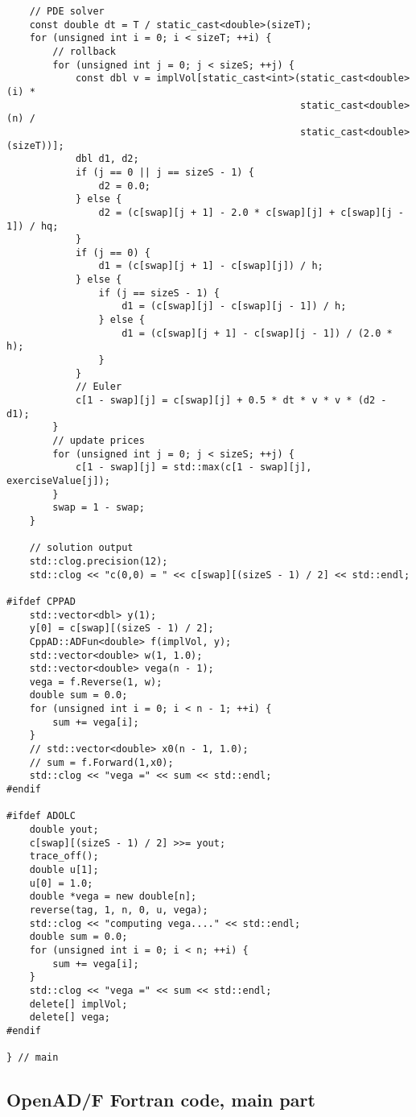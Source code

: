 \documentclass{amsart}
\theoremstyle{plain}
\numberwithin{equation}{section}
\begin{document}
\begin{verbatim}
    // PDE solver
    const double dt = T / static_cast<double>(sizeT);
    for (unsigned int i = 0; i < sizeT; ++i) {
        // rollback
        for (unsigned int j = 0; j < sizeS; ++j) {
            const dbl v = implVol[static_cast<int>(static_cast<double>(i) *
                                                   static_cast<double>(n) /
                                                   static_cast<double>(sizeT))];
            dbl d1, d2;
            if (j == 0 || j == sizeS - 1) {
                d2 = 0.0;
            } else {
                d2 = (c[swap][j + 1] - 2.0 * c[swap][j] + c[swap][j - 1]) / hq;
            }
            if (j == 0) {
                d1 = (c[swap][j + 1] - c[swap][j]) / h;
            } else {
                if (j == sizeS - 1) {
                    d1 = (c[swap][j] - c[swap][j - 1]) / h;
                } else {
                    d1 = (c[swap][j + 1] - c[swap][j - 1]) / (2.0 * h);
                }
            }
            // Euler
            c[1 - swap][j] = c[swap][j] + 0.5 * dt * v * v * (d2 - d1);
        }
        // update prices
        for (unsigned int j = 0; j < sizeS; ++j) {
            c[1 - swap][j] = std::max(c[1 - swap][j], exerciseValue[j]);
        }
        swap = 1 - swap;
    }

    // solution output
    std::clog.precision(12);
    std::clog << "c(0,0) = " << c[swap][(sizeS - 1) / 2] << std::endl;

#ifdef CPPAD
    std::vector<dbl> y(1);
    y[0] = c[swap][(sizeS - 1) / 2];
    CppAD::ADFun<double> f(implVol, y);
    std::vector<double> w(1, 1.0);
    std::vector<double> vega(n - 1);
    vega = f.Reverse(1, w);
    double sum = 0.0;
    for (unsigned int i = 0; i < n - 1; ++i) {
        sum += vega[i];
    }
    // std::vector<double> x0(n - 1, 1.0);
    // sum = f.Forward(1,x0);
    std::clog << "vega =" << sum << std::endl;
#endif

#ifdef ADOLC
    double yout;
    c[swap][(sizeS - 1) / 2] >>= yout;
    trace_off();
    double u[1];
    u[0] = 1.0;
    double *vega = new double[n];
    reverse(tag, 1, n, 0, u, vega);
    std::clog << "computing vega...." << std::endl;
    double sum = 0.0;
    for (unsigned int i = 0; i < n; ++i) {
        sum += vega[i];
    }
    std::clog << "vega =" << sum << std::endl;
    delete[] implVol;
    delete[] vega;
#endif

} // main
\end{verbatim}

\subsection{OpenAD/F Fortran code, main part}
\end{document}
